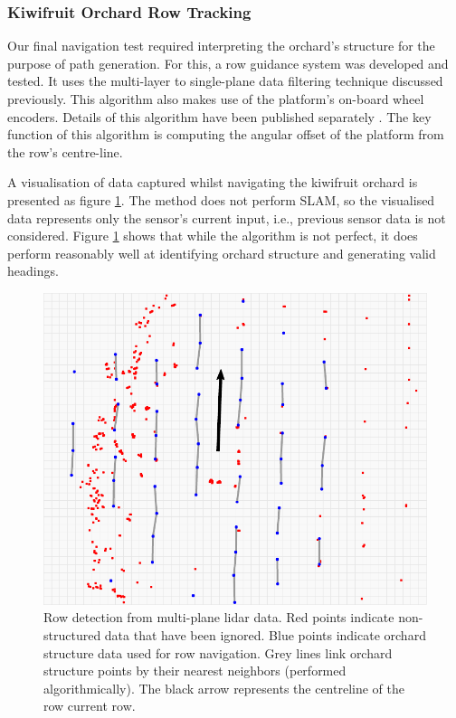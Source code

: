 \documentclass[preprint,authoryear,12pt]{elsarticle}
\begin{document}
    \subsubsection{Kiwifruit Orchard Row Tracking}
        \label{sect:row_tracking}

        Our final navigation test required interpreting the orchard's structure for the purpose of path generation.
        For this, a row guidance system was developed and tested.
        It uses the multi-layer to single-plane data filtering technique discussed previously.
        This algorithm also makes use of the platform's on-board wheel encoders.
        Details of this algorithm have been published separately \citep{Bell2016}.
        The key function of this algorithm is computing the angular offset of the platform from the row's centre-line.

        A visualisation of data captured whilst navigating the kiwifruit orchard is presented as figure \ref{fig:lastLidarFrame}.
        The method does not perform SLAM, so the visualised data represents only the sensor's current input, i.e., previous sensor data is not considered.
        Figure \ref{fig:lastLidarFrame} shows that while the algorithm is not perfect, it does perform reasonably well at identifying orchard structure and generating valid headings.

        \begin{figure}[htb]
            \centering
            \includegraphics[width=\linewidth]{imgs/row_following/row_following_narrow.pdf}
            \caption{
                Row detection from multi-plane lidar data.
                Red points indicate non-structured data that have been ignored.
                Blue points indicate orchard structure data used for row navigation.
                Grey lines link orchard structure points by their nearest neighbors (performed algorithmically).
                The black arrow represents the centreline of the row current row.
            }
            \label{fig:lastLidarFrame}
        \end{figure}
\end{document}
